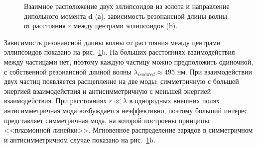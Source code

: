 \begin{figure}[h]
\caption{Взаимное расположение двух эллипсоидов из золота и направление дипольного момента $ \textbf{d} $ (а), зависимость резонансной длины волны от расстояния $ r $ между центрами эллипсоидов (b).}
\label{img:semianalytical_dd}
\end{figure}

Зависимость резонансной длины волны от расстояния между центрами эллипсоидов показано на рис.~\ref{img:semianalytical_dd}b. На больших расстояниях взаимодействия между частицами нет, поэтому каждую частицу можно предположить одиночной, с собственной резонансной длиной волны $ \lambda_{isolated} \approx  495 $ нм. При взаимодействии двух частиц появляется расщепление на две моды: симметричную с большей энергией взаимодействия и антисимметричную с меньшей энергией взаимодействия. При расстояниях $ r \ll \lambda $ в однородных внешних полях антисимметричная мода возбуждается неэффективно, поэтому больший интерес представляет симметричная мода, на которой построены принципы <<плазмонной  линейки>>. Мгновенное распределение зарядов в симметричном  и антисимметричном случае показано на рис.~\ref{img:semianalytical_dd}b. 